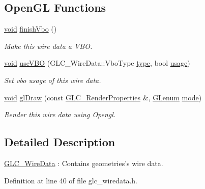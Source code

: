 \subsection*{Open\-G\-L Functions}
\begin{DoxyCompactItemize}
\item 
\hyperlink{group___u_a_v_objects_plugin_ga444cf2ff3f0ecbe028adce838d373f5c}{void} \hyperlink{class_g_l_c___wire_data_aa3e59137724950ceaddc1247e367d8a7}{finish\-Vbo} ()
\begin{DoxyCompactList}\small\item\em Make this wire data a V\-B\-O. \end{DoxyCompactList}\item 
\hyperlink{group___u_a_v_objects_plugin_ga444cf2ff3f0ecbe028adce838d373f5c}{void} \hyperlink{class_g_l_c___wire_data_a5a820c1b8a9fd62797c060391dd2b880}{use\-V\-B\-O} (G\-L\-C\-\_\-\-Wire\-Data\-::\-Vbo\-Type \hyperlink{glext_8h_a7d05960f4f1c1b11f3177dc963a45d86}{type}, bool \hyperlink{glext_8h_ae759ed0394ed5353d8bef2fb755305da}{usage})
\begin{DoxyCompactList}\small\item\em Set vbo usage of this wire data. \end{DoxyCompactList}\item 
\hyperlink{group___u_a_v_objects_plugin_ga444cf2ff3f0ecbe028adce838d373f5c}{void} \hyperlink{class_g_l_c___wire_data_a1f137f6252800a88abe9d660bab86d2e}{gl\-Draw} (const \hyperlink{class_g_l_c___render_properties}{G\-L\-C\-\_\-\-Render\-Properties} \&, \hyperlink{glext_8h_a508b2dec21679e2e346cad3e0d1969bf}{G\-Lenum} \hyperlink{glext_8h_a1e71d9c196e4683cc06c4b54d53f7ef5}{mode})
\begin{DoxyCompactList}\small\item\em Render this wire data using Opengl. \end{DoxyCompactList}\end{DoxyCompactItemize}


\subsection{Detailed Description}
\hyperlink{class_g_l_c___wire_data}{G\-L\-C\-\_\-\-Wire\-Data} \-: Contains geometries's wire data. 

Definition at line 40 of file glc\-\_\-wiredata.\-h.



